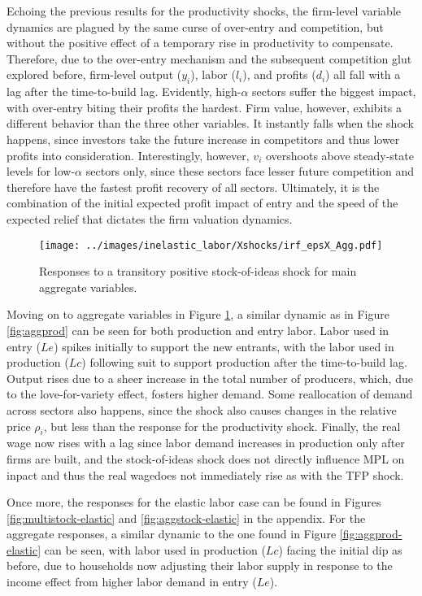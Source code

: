 \documentclass[a4paper,12pt]{article} %
\numberwithin{equation}{section} %
\numberwithin{figure}{section}
\numberwithin{table}{section}
\begin{document}
Echoing the previous results for the productivity shocks, the firm-level variable dynamics are plagued by the same curse of over-entry
and competition, but without the positive effect of a temporary rise in productivity to compensate. Therefore, due to the over-entry mechanism
and the subsequent competition glut explored before, firm-level output ($y_i$), labor ($l_i$), and profits ($d_i$) all fall with a lag after the
time-to-build lag. Evidently, high-$\alpha$ sectors suffer the biggest impact, with over-entry biting their profits the hardest. Firm value,
however, exhibits a different behavior than the three other variables. It instantly falls when the shock happens, since investors take the future
increase in competitors and thus lower profits into consideration. Interestingly, however, $v_i$ overshoots above steady-state levels for low-$\alpha$
sectors only, since these sectors face lesser future competition and therefore have the fastest profit recovery of all sectors. Ultimately, it is
the combination of the initial expected profit impact of entry and the speed of the expected relief that dictates the firm valuation dynamics.

\begin{figure}[H]
  \centering
  \texttt{[image: ../images/inelastic\_labor/Xshocks/irf\_epsX\_Agg.pdf]}
  \caption{Responses to a transitory positive stock-of-ideas shock for main aggregate variables.}
  \label{fig:aggstock}
\end{figure}

Moving on to aggregate variables in Figure \ref{fig:aggstock}, a similar dynamic as in Figure \ref{fig:aggprod} can be seen for both 
production and entry labor. Labor used in entry ($Le$) spikes initially to support the new entrants, with the labor used in production ($Lc$)
following suit to support production after the time-to-build lag. Output rises due to a sheer increase in the total number of producers, which,
due to the love-for-variety effect, fosters higher demand. Some reallocation of demand across sectors also happens, since the shock also causes
changes in the relative price $\rho_i$, but less than the response for the productivity shock. Finally, the real wage now rises with a lag since
labor demand increases in production only after firms are built, and the stock-of-ideas shock does not directly influence MPL on inpact and thus the 
real wagedoes not immediately rise as with the TFP shock.

Once more, the responses for the elastic labor case can be found in Figures \ref{fig:multistock-elastic} and \ref{fig:aggstock-elastic} 
in the appendix.
For the aggregate responses, a similar dynamic to the one found in Figure \ref{fig:aggprod-elastic} can be seen, with labor used in 
production ($Lc$) facing the initial dip as before, due to households now adjusting their labor supply in response to the income effect 
from higher labor demand in entry ($Le$).
\end{document}
